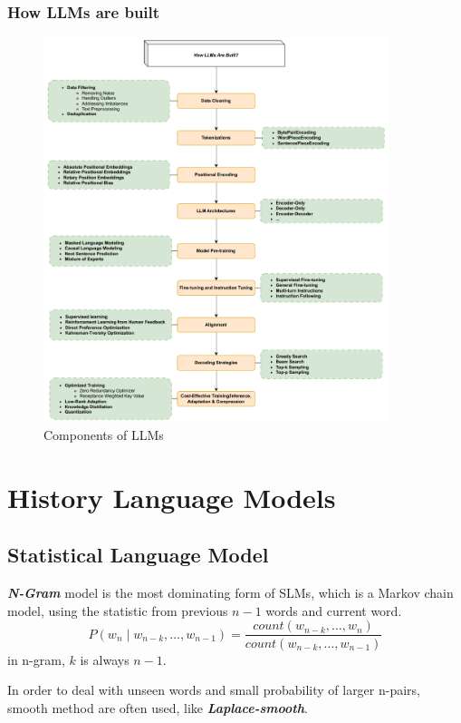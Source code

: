 \documentclass[10pt]{elegantbook}
\newcommand{\mydefination}[1]{\textbf{\textit{\textcolor{structurecolor}{#1}}}}
\begin{document}
\subsection{How LLMs are built}
\begin{figure}[htbp]
    \centering
    \includegraphics[width=0.90\textwidth]{image/how_llm_works.png}
    \caption{Components of LLMs}
    \label{fig:how_llm_works}
\end{figure}

\chapter{History Language Models}

\section{Statistical Language Model}

\mydefination{N-Gram} model is the most dominating form of SLMs, which is a Markov chain model, using the statistic from
previous $n-1$ words and current word.
\[ P(w_n \mid w_{n-k}, \ldots, w_{n-1}) = \frac{count(w_{n-k}, \ldots, w_{n})}{count(w_{n-k}, \ldots, w_{n-1})} \]
in n-gram, $k$ is always $n-1$.

In order to deal with unseen words and small probability of larger n-pairs, smooth method are often used, like 
\mydefination{Laplace-smooth}.
\end{document}
